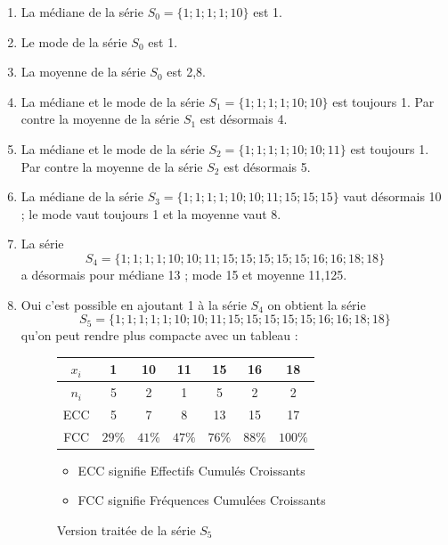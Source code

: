 \documentclass[11pt]{article}
\begin{document}
\begin{enumerate}
\item La médiane de  la série \(S_0 = \{1 ; 1 ; 1 ; 1 ; 10\}\) est 1.
\item Le mode de  la série \(S_0\) est 1.
\item La moyenne de  la série \(S_0\) est 2,8.
\item La médiane et le mode de la série \(S_1 = \{1 ; 1 ; 1 ; 1 ; 10 ;
   10\}\) est toujours 1. Par contre la moyenne de la série \(S_1\) est
désormais 4.
\item La médiane et le mode de la série \(S_2 = \{1 ; 1 ; 1 ; 1 ; 10 ; 10
   ; 11\}\) est toujours 1. Par contre la moyenne de la série \(S_2\) est
désormais 5.
\item La médiane de la série \(S_3 = \{1 ; 1 ; 1 ; 1 ; 10 ; 10 ; 11 ; 15 ;
   15 ; 15\}\) vaut désormais 10 ; le mode vaut toujours 1 et la
moyenne vaut 8.
\item La série \[S_4 = \{1 ; 1 ; 1 ; 1 ; 10 ; 10 ; 11 ; 15 ; 15 ; 15 ; 15
   ; 15 ; 16 ; 16 ; 18 ; 18\}\] a désormais pour médiane 13 ; mode 15
et moyenne 11,125.
\item Oui c'est possible en ajoutant 1 à la série \(S_4\) on obtient la
série \[S_5 = \{1 ; 1 ; 1 ; 1 ; 1 ; 10 ; 10 ; 11 ; 15 ; 15 ; 15 ;
   15 ; 15 ; 16 ; 16 ; 18 ; 18\}\] qu'on peut rendre plus compacte
avec un tableau :   
\begin{center}
	\begin{figure}[H]
	\caption{Version traitée de la série $S_5$}
	\centering
	\vspace{.5cm}
	\begin{tabular}{*{7}{|c}|}
		\hline
		$x_i$ & 1 & 10 & 11 & 15 & 16 & 18 \\
		\hline
		$n_i$ & 5 & 2 & 1 & 5 & 2 & 2 \\
		\hline
		ECC & 5 & 7 & 8 & 13 & 15 & 17\\
		\hline
		FCC & $29\%$ & $41\%$ & $47\%$ & $76\%$ & $88\%$ & $100\%$  \\
		\hline
	\end{tabular}
		\vspace{.5cm}
		\begin{itemize}
			\item ECC signifie Effectifs Cumulés Croissants
			\item FCC signifie Fréquences Cumulées Croissants
		\end{itemize}
	\end{figure}
\end{center}
\end{enumerate}
\end{document}
